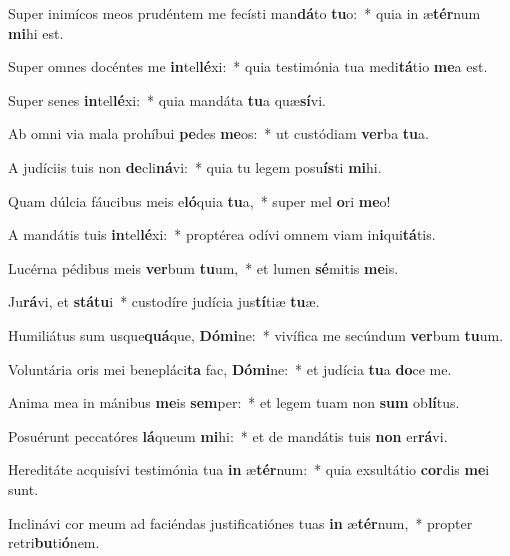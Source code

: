 \item Super inimícos meos prudéntem me fecísti man\textbf{dá}to \textbf{tu}o:~* quia in æ\textbf{tér}num \textbf{mi}hi est.
\item Super omnes docéntes me \textbf{in}tel\textbf{lé}xi:~* quia testimónia tua medi\textbf{tá}tio \textbf{me}a est.
\item Super senes \textbf{in}tel\textbf{lé}xi:~* quia mandáta \textbf{tu}a quæ\textbf{sí}vi.
\item Ab omni via mala prohíbui \textbf{pe}des \textbf{me}os:~* ut custódiam \textbf{ver}ba \textbf{tu}a.
\item A judíciis tuis non \textbf{de}cli\textbf{ná}vi:~* quia tu legem posu\textbf{ís}ti \textbf{mi}hi.
\item Quam dúlcia fáucibus meis e\textbf{ló}quia \textbf{tu}a,~* super mel \textbf{o}ri \textbf{me}o!
\item A mandátis tuis \textbf{in}tel\textbf{lé}xi:~* proptérea odívi omnem viam in\textbf{i}qui\textbf{tá}tis.
\item Lucérna pédibus meis \textbf{ver}bum \textbf{tu}um,~* et lumen \textbf{sé}mitis \textbf{me}is.
\item Ju\textbf{rá}vi, et \textbf{stá}\textbf{tu}i~* custodíre judícia jus\textbf{tí}tiæ \textbf{tu}æ.
\item Humiliátus sum usque\textbf{quá}que, \textbf{Dó}\textbf{mi}ne:~* vivífica me secúndum \textbf{ver}bum \textbf{tu}um.
\item Voluntária oris mei benepláci\textbf{ta} fac, \textbf{Dó}\textbf{mi}ne:~* et judícia \textbf{tu}a \textbf{do}ce me.
\item Anima mea in mánibus \textbf{me}is \textbf{sem}per:~* et legem tuam non \textbf{sum} ob\textbf{lí}tus.
\item Posuérunt peccatóres \textbf{lá}queum \textbf{mi}hi:~* et de mandátis tuis \textbf{non} er\textbf{rá}vi.
\item Hereditáte acquisívi testimónia tua \textbf{in} æ\textbf{tér}num:~* quia exsultátio \textbf{cor}dis \textbf{me}i sunt.
\item Inclinávi cor meum ad faciéndas justificatiónes tuas \textbf{in} æ\textbf{tér}num,~* propter retri\textbf{bu}ti\textbf{ó}nem.
